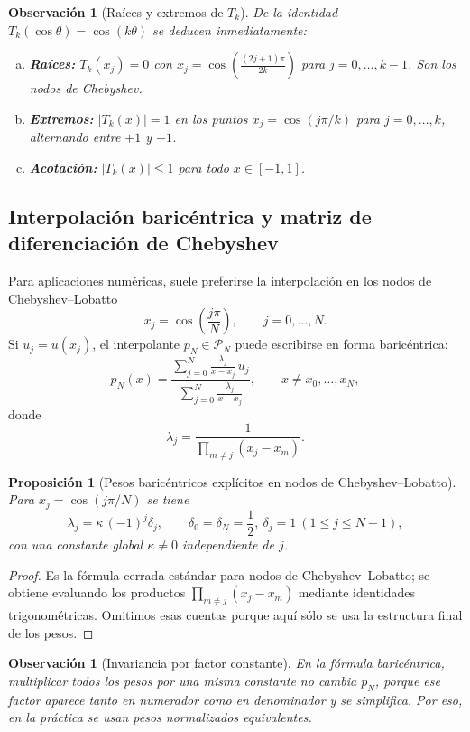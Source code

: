 \documentclass[a4paper,11pt]{report}
\newtheorem{proposition}[theorem]{Proposición}
\newtheorem{remark}[theorem]{Observación}
\begin{document}
\begin{remark}[Raíces y extremos de $T_k$]
De la identidad $T_k(\cos\theta) = \cos(k\theta)$ se deducen inmediatamente:
\begin{enumerate}[(a)]
\item \textbf{Raíces:} $T_k(x_j) = 0$ con $x_j = \cos\!\left(\frac{(2j+1)\pi}{2k}\right)$ para $j = 0,\ldots,k-1$.  Son los nodos de Chebyshev.
\item \textbf{Extremos:} $|T_k(x)| = 1$ en los puntos $x_j = \cos(j\pi/k)$ para $j = 0,\ldots,k$, alternando entre $+1$ y $-1$.
\item \textbf{Acotación:} $|T_k(x)| \leq 1$ para todo $x \in [-1,1]$.
\end{enumerate}
\end{remark}


\subsection{Interpolación baricéntrica y matriz de diferenciación de Chebyshev}

Para aplicaciones numéricas, suele preferirse la interpolación en los nodos de Chebyshev--Lobatto
\[
x_j=\cos\!\left(\frac{j\pi}{N}\right),\qquad j=0,\dots,N.
\]
Si $u_j=u(x_j)$, el interpolante $p_N\in\mathcal P_N$ puede escribirse en forma baricéntrica:
\[
p_N(x)=\frac{\displaystyle\sum_{j=0}^N \frac{\lambda_j}{x-x_j}\,u_j}{\displaystyle\sum_{j=0}^N \frac{\lambda_j}{x-x_j}},
\qquad x\neq x_0,\dots,x_N,
\]
donde
\[
\lambda_j=\frac{1}{\prod_{m\ne j}(x_j-x_m)}.
\]

\begin{proposition}[Pesos baricéntricos explícitos en nodos de Chebyshev--Lobatto]\label{prop:pesos_baricentricos_cheb}
Para $x_j=\cos(j\pi/N)$ se tiene
\[
\lambda_j=\kappa\,(-1)^j\delta_j,
\qquad
\delta_0=\delta_N=\frac12,\ \delta_j=1\ (1\le j\le N-1),
\]
con una constante global $\kappa\neq0$ independiente de $j$.
\end{proposition}

\begin{proof}
Es la fórmula cerrada estándar para nodos de Chebyshev--Lobatto; se obtiene evaluando los productos $\prod_{m\ne j}(x_j-x_m)$ mediante identidades trigonométricas. Omitimos esas cuentas porque aquí sólo se usa la estructura final de los pesos.
\end{proof}

\begin{remark}[Invariancia por factor constante]
En la fórmula baricéntrica, multiplicar todos los pesos por una misma constante no cambia $p_N$, porque ese factor aparece tanto en numerador como en denominador y se simplifica. Por eso, en la práctica se usan pesos normalizados equivalentes.
\end{remark}
\end{document}
